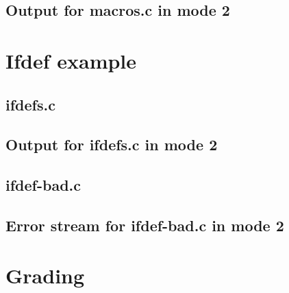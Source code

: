 \documentclass{article}
\begin{document}


\subsection{Output for macros.c in mode 2}




\section{Ifdef example}

\subsection{ifdefs.c}



\subsection{Output for ifdefs.c in mode 2}



\subsection{ifdef-bad.c}



\subsection{Error stream for ifdef-bad.c in mode 2}




\section{Grading}
\end{document}
